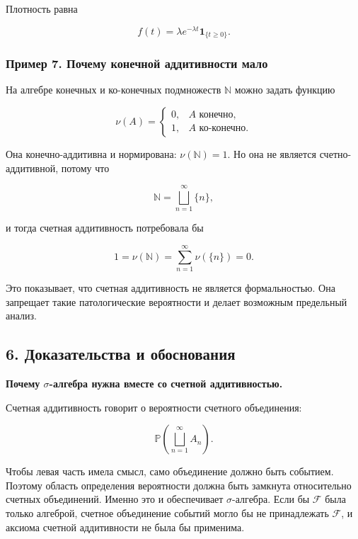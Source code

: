 \documentclass[
  11pt,
  a4paper,
]{article}
\begin{document}
Плотность равна

\[
f(t)=\lambda e^{-\lambda t}\mathbf 1_{\{t\ge0\}}.
\]

\subsubsection{Пример 7. Почему конечной аддитивности
мало}\label{ux43fux440ux438ux43cux435ux440-7.-ux43fux43eux447ux435ux43cux443-ux43aux43eux43dux435ux447ux43dux43eux439-ux430ux434ux434ux438ux442ux438ux432ux43dux43eux441ux442ux438-ux43cux430ux43bux43e}

На алгебре конечных и ко-конечных подмножеств \(\mathbb N\) можно задать
функцию

\[
\nu(A)=
\begin{cases}
0, & A\text{ конечно},\\
1, & A\text{ ко-конечно}.
\end{cases}
\]

Она конечно-аддитивна и нормирована: \(\nu(\mathbb N)=1\). Но она не
является счетно-аддитивной, потому что

\[
\mathbb N=\bigsqcup_{n=1}^{\infty}\{n\},
\]

и тогда счетная аддитивность потребовала бы

\[
1=\nu(\mathbb N)=\sum_{n=1}^{\infty}\nu(\{n\})=0.
\]

Это показывает, что счетная аддитивность не является формальностью. Она
запрещает такие патологические вероятности и делает возможным предельный
анализ.

\subsection{6. Доказательства и
обоснования}\label{ux434ux43eux43aux430ux437ux430ux442ux435ux43bux44cux441ux442ux432ux430-ux438-ux43eux431ux43eux441ux43dux43eux432ux430ux43dux438ux44f}

\textbf{Почему \(\sigma\)-алгебра нужна вместе со счетной
аддитивностью.}

Счетная аддитивность говорит о вероятности счетного объединения:

\[
\mathbb P\left(\bigsqcup_{n=1}^{\infty}A_n\right).
\]

Чтобы левая часть имела смысл, само объединение должно быть событием.
Поэтому область определения вероятности должна быть замкнута
относительно счетных объединений. Именно это и обеспечивает
\(\sigma\)-алгебра. Если бы \(\mathcal F\) была только алгеброй, счетное
объединение событий могло бы не принадлежать \(\mathcal F\), и аксиома
счетной аддитивности не была бы применима.
\end{document}
